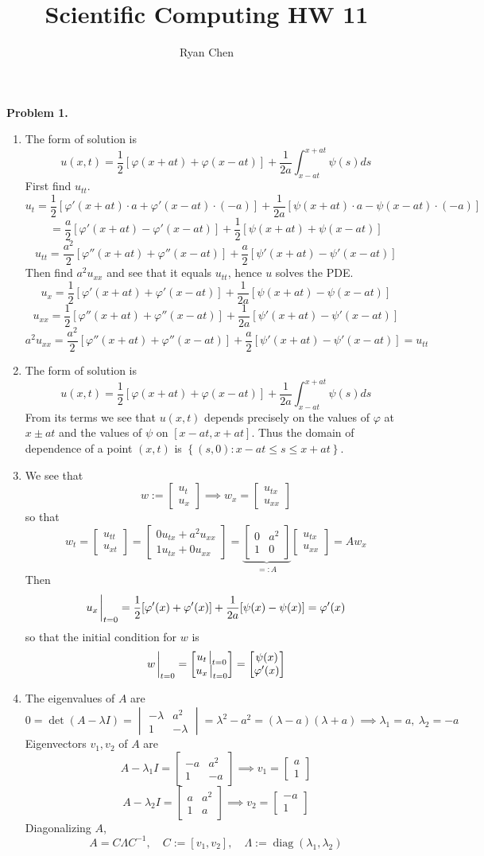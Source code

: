 \documentclass{article}
\title{Scientific Computing HW 11}
\author{Ryan Chen}
\def\tbf#1{\textbf{#1}}
\newcommand{\brc}[1]{\left\{#1\right\}}
\newcommand{\m}[2][b]{\begin{#1matrix}#2\end{#1matrix}}
\newcommand{\vp}{\varphi}
\newcommand{\inv}{^{-1}}
\newcommand{\imp}{\implies}
\DeclareMathOperator{\diag}{diag}
\begin{document}
	
\maketitle



\tbf{Problem 1.}

\begin{enumerate}[label=(\alph*)]
	
\item The form of solution is
$$u(x,t) = \frac12[\vp(x+at)+\vp(x-at)] + \frac{1}{2a}\int_{x-at}^{x+at}\psi(s)ds$$
First find $u_{tt}$.
$$u_t = \frac12[\vp'(x+at)\cdot a+\vp'(x-at)\cdot(-a)] + \frac{1}{2a}[\psi(x+at)\cdot a-\psi(x-at)\cdot(-a)]$$
$$= \frac{a}{2}[\vp'(x+at)-\vp'(x-at)] + \frac12[\psi(x+at)+\psi(x-at)]$$
$$u_{tt} = \frac{a^2}{2}[\vp''(x+at)+\vp''(x-at)] + \frac a2[\psi'(x+at)-\psi'(x-at)]$$
Then find $a^2u_{xx}$ and see that it equals $u_{tt}$, hence $u$ solves the PDE.
$$u_x = \frac12[\vp'(x+at)+\vp'(x-at)] + \frac{1}{2a}[\psi(x+at)-\psi(x-at)]$$
$$u_{xx} = \frac12[\vp''(x+at)+\vp''(x-at)] + \frac{1}{2a}[\psi'(x+at)-\psi'(x-at)]$$
$$a^2u_{xx} = \frac{a^2}{2}[\vp''(x+at)+\vp''(x-at)] + \frac{a}{2}[\psi'(x+at)-\psi'(x-at)] = u_{tt}$$


\item The form of solution is
$$u(x,t) = \frac12[\vp(x+at)+\vp(x-at)] + \frac{1}{2a}\int_{x-at}^{x+at}\psi(s)ds$$
From its terms we see that $u(x,t)$ depends precisely on the values of $\vp$ at $x\pm at$ and the values of $\psi$ on $[x-at,x+at]$. Thus the domain of dependence of a point $(x,t)$ is $\brc{(s,0):x-at\le s\le x+at}$.


\item We see that
$$w := \m{u_t \\ u_x}
\imp w_x = \m{u_{tx} \\ u_{xx}}$$
so that
$$w_t = \m{u_{tt} \\ u_{xt}}
= \m{0u_{tx}+a^2u_{xx} \\ 1u_{tx}+0u_{xx}}
= \underbrace{\m{0 & a^2 \\ 1 & 0}}_{=:A}\m{u_{tx} \\ u_{xx}}
= Aw_x$$
Then
$$u_x\eval_{t=0} = \frac12[\vp'(x)+\vp'(x)] + \frac{1}{2a}[\psi(x)-\psi(x)]
= \vp'(x)$$
so that the initial condition for $w$ is
$$w\eval_{t=0} = \m{u_t\eval_{t=0} \\ u_x\eval_{t=0}}
= \m{\psi(x) \\ \vp'(x)}$$


\item The eigenvalues of $A$ are
$$0 = \det(A-\lambda I)
= \m[v]{-\lambda & a^2 \\ 1 & -\lambda}
= \lambda^2 - a^2
= (\lambda-a)(\lambda+a)
\imp \lambda_1 = a,~\lambda_2 = -a$$
Eigenvectors $v_1,v_2$ of $A$ are
$$A-\lambda_1I = \m{-a & a^2 \\ 1 & -a}
\imp v_1 = \m{a \\ 1}$$
$$A-\lambda_2I = \m{a & a^2 \\ 1 & a}
\imp v_2 = \m{-a \\ 1}$$
Diagonalizing $A$,
$$A = C\Lambda C\inv,
\quad C := [v_1,v_2],
\quad \Lambda := \diag(\lambda_1,\lambda_2)$$


\end{enumerate}
\end{document}
